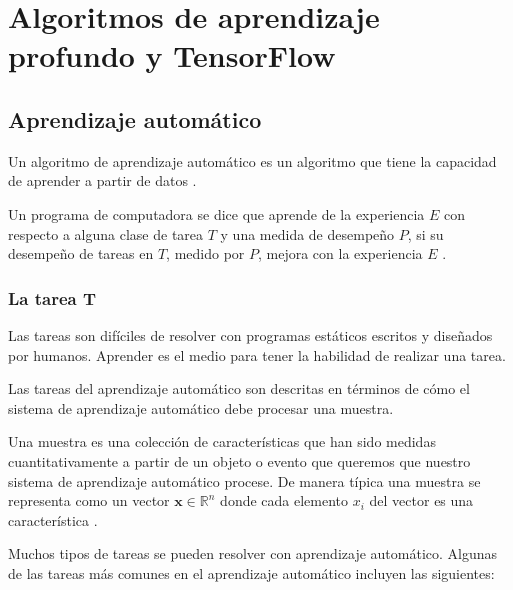 

\section{Algoritmos de aprendizaje profundo y TensorFlow}\label{chapter_two/deep_learning_tf}
\subsection{Aprendizaje automático}\label{aprendizaje-automuxe1tico}

\begin{remark}
Un algoritmo de
aprendizaje automático es un algoritmo que tiene la capacidad de
aprender a partir de datos \cite{iangoodfellowyoshuabengioaaroncourville2017}.\\
\end{remark}

\begin{remark}
Un programa de computadora se dice que aprende de la experiencia $E$ con
respecto a alguna clase de tarea $T$ y una medida de desempeño $P$, si su
desempeño de tareas en $T$, medido por $P$, mejora con la experiencia $E$ \cite{iangoodfellowyoshuabengioaaroncourville2017}.
\end{remark}


\subsubsection{La tarea T}\label{la-tarea-t}

Las tareas son difíciles de resolver con programas estáticos escritos y
diseñados por humanos.
Aprender es el medio para tener la habilidad de realizar una tarea.

Las tareas del aprendizaje automático son descritas en términos de cómo
el sistema de aprendizaje automático debe procesar una muestra.\\

\begin{remark}
Una muestra es una colección de características que han sido medidas
cuantitativamente a partir de un objeto o evento que queremos que
nuestro sistema de aprendizaje automático procese. De manera típica una
muestra se representa como un vector $\mathbf{x} \in \mathbb{R}^{n}$ donde cada elemento
$x_i$ del vector es una característica \cite{iangoodfellowyoshuabengioaaroncourville2017}.
\end{remark}

Muchos tipos de tareas se pueden resolver con aprendizaje automático.
Algunas de las tareas más comunes en el aprendizaje automático incluyen
las siguientes:

